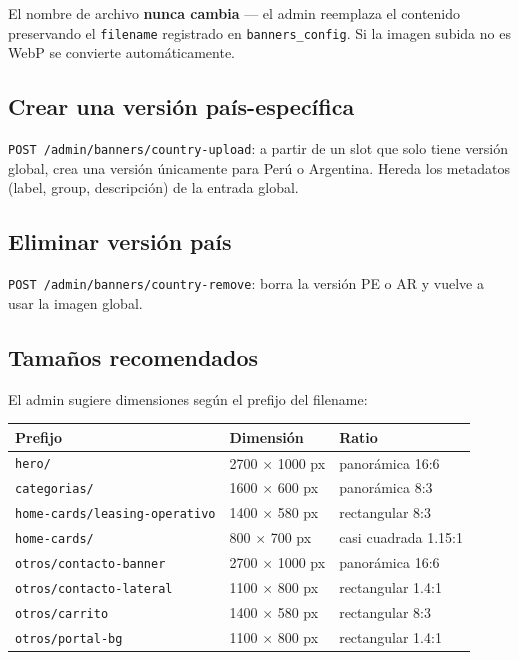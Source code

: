 \documentclass[11pt,a4paper]{article}
\begin{document}
El nombre de archivo \textbf{nunca cambia} --- el admin reemplaza el
contenido preservando el \texttt{filename} registrado en
\texttt{banners\_config}. Si la imagen subida no es WebP se convierte
automáticamente.

\subsection{Crear una versión país-específica}

\texttt{POST /admin/banners/country-upload}: a partir de un slot que solo
tiene versión global, crea una versión únicamente para Perú o Argentina.
Hereda los metadatos (label, group, descripción) de la entrada global.

\subsection{Eliminar versión país}

\texttt{POST /admin/banners/country-remove}: borra la versión PE o AR y
vuelve a usar la imagen global.

\subsection{Tamaños recomendados}

El admin sugiere dimensiones según el prefijo del filename:

\begin{center}
\begin{tabular}{l l l}
\toprule
\textbf{Prefijo} & \textbf{Dimensión} & \textbf{Ratio} \\
\midrule
\texttt{hero/}                          & 2700 $\times$ 1000 px & panorámica 16:6 \\
\texttt{categorias/}                    & 1600 $\times$ 600 px  & panorámica 8:3 \\
\texttt{home-cards/leasing-operativo}   & 1400 $\times$ 580 px  & rectangular 8:3 \\
\texttt{home-cards/}                    & 800 $\times$ 700 px   & casi cuadrada 1.15:1 \\
\texttt{otros/contacto-banner}          & 2700 $\times$ 1000 px & panorámica 16:6 \\
\texttt{otros/contacto-lateral}         & 1100 $\times$ 800 px  & rectangular 1.4:1 \\
\texttt{otros/carrito}                  & 1400 $\times$ 580 px  & rectangular 8:3 \\
\texttt{otros/portal-bg}                & 1100 $\times$ 800 px  & rectangular 1.4:1 \\
\bottomrule
\end{tabular}
\end{center}
\end{document}
